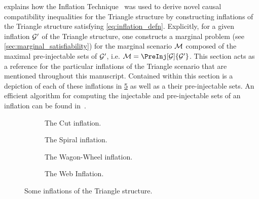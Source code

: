 \documentclass[aps, 10pt, english, twoside, pra, nofootinbib, tightenlines, longbibliography, superscriptaddress]{revtex4-1}
\begin{document}
     explains how the Inflation Technique~\cite{Inflation} was used to derive novel causal compatibility inequalities for the Triangle structure by constructing inflations of the Triangle structure satisfying \cref{eq:inflation_defn}. Explicitly, for a given inflation $\mathcal{G}'$ of the Triangle structure, one constructs a marginal problem (see \cref{sec:marginal_satisfiability}) for the marginal scenario $\mathcal{M}$ composed of the maximal pre-injectable sets of $\mathcal{G}'$, i.e. $\mscenario = \PreInj[\graph]{\graph'}$. This section acts as a reference for the particular inflations of the Triangle scenario that are mentioned throughout this manuscript. Contained within this section is a depiction of each of these inflations in \cref{fig:inflations} as well as a their pre-injectable sets. An efficient algorithm for computing the injectable and pre-injectable sets of an inflation can be found in~\cite{Inflation}.
    \begin{center}
    \begin{figure}
    \begin{subfigure}[b]{.45\linewidth}
    \scalebox{1}{}
    \caption{The Cut inflation.}\label{fig:cut_inflation}
    \end{subfigure}
    \begin{subfigure}[b]{.45\linewidth}
    \scalebox{1}{}
    \caption{The Spiral inflation.}\label{fig:spiral_inflation}
    \end{subfigure}

    \begin{subfigure}[b]{.45\linewidth}
    \scalebox{1.0}{}
    \caption{The Wagon-Wheel inflation.}\label{fig:wagon_wheel_inflation}
    \end{subfigure}
    \begin{subfigure}[b]{.45\linewidth}
    \scalebox{1}{}
    \caption{The Web Inflation.}\label{fig:the_web_inflation}
    \end{subfigure}
    \caption{Some inflations of the Triangle structure.}
    \label{fig:inflations}
    \end{figure}
    \end{center}
\end{document}
